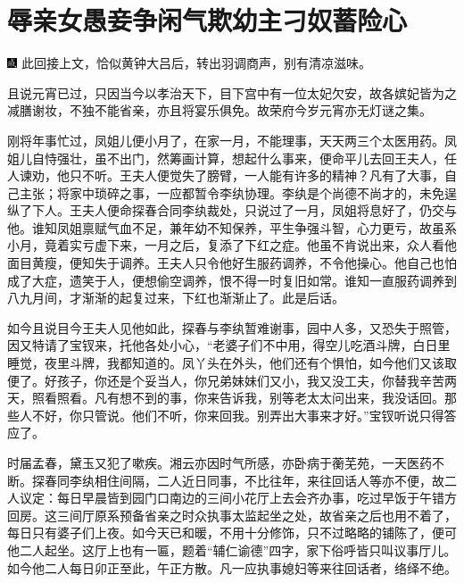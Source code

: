 

\chapter{辱亲女愚妾争闲气\hspace{.5em}欺幼主刁奴蓄险心}

{\includegraphics[width=3mm]{../Images/00005}  \kaishu 此回接上文，恰似黄钟大吕后，转出羽调商声，别有清凉滋味。}

且说元宵已过，只因当今以孝治天下，目下宫中有一位太妃欠安，故各嫔妃皆为之减膳谢妆，不独不能省亲，亦且将宴乐俱免。故荣府今岁元宵亦无灯谜之集。

刚将年事忙过，凤姐儿便小月了，在家一月，不能理事，天天两三个太医用药。凤姐儿自恃强壮，虽不出门，然筹画计算，想起什么事来，便命平儿去回王夫人，任人谏劝，他只不听。王夫人便觉失了膀臂，一人能有许多的精神？凡有了大事，自己主张；将家中琐碎之事，一应都暂令李纨协理。李纨是个尚德不尚才的，未免逞纵了下人。王夫人便命探春合同李纨裁处，只说过了一月，凤姐将息好了，仍交与他。谁知凤姐禀赋气血不足，兼年幼不知保养，平生争强斗智，心力更亏，故虽系小月，竟着实亏虚下来，一月之后，复添了下红之症。他虽不肯说出来，众人看他面目黄瘦，便知失于调养。王夫人只令他好生服药调养，不令他操心。他自己也怕成了大症，遗笑于人，便想偷空调养，恨不得一时复旧如常。谁知一直服药调养到八九月间，才渐渐的起复过来，下红也渐渐止了。此是后话。

如今且说目今王夫人见他如此，探春与李纨暂难谢事，园中人多，又恐失于照管，因又特请了宝钗来，托他各处小心，``老婆子们不中用，得空儿吃酒斗牌，白日里睡觉，夜里斗牌，我都知道的。凤丫头在外头，他们还有个惧怕，如今他们又该取便了。好孩子，你还是个妥当人，你兄弟妹妹们又小，我又没工夫，你替我辛苦两天，照看照看。凡有想不到的事，你来告诉我，别等老太太问出来，我没话回。那些人不好，你只管说。他们不听，你来回我。别弄出大事来才好。''宝钗听说只得答应了。

时届孟春，黛玉又犯了嗽疾。湘云亦因时气所感，亦卧病于蘅芜苑，一天医药不断。探春同李纨相住间隔，二人近日同事，不比往年，来往回话人等亦不便，故二人议定：每日早晨皆到园门口南边的三间小花厅上去会齐办事，吃过早饭于午错方回房。这三间厅原系预备省亲之时众执事太监起坐之处，故省亲之后也用不着了，每日只有婆子们上夜。如今天已和暖，不用十分修饰，只不过略略的铺陈了，便可他二人起坐。这厅上也有一匾，题着``辅仁谕德''四字，家下俗呼皆只叫议事厅儿。如今他二人每日卯正至此，午正方散。凡一应执事媳妇等来往回话者，络绎不绝。

